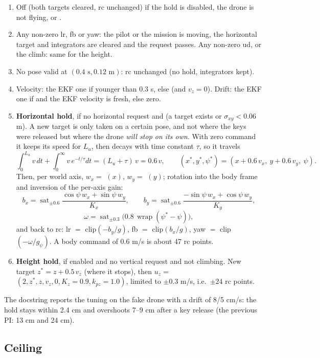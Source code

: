 \begin{enumerate}[itemsep=1pt]
\item Off (both targets cleared, rc unchanged) if the hold is disabled, the drone is not flying, or
.
\item Any non-zero lr, fb or yaw: the pilot or the mission is moving, the horizontal target and integrators are
cleared and the request passes. Any non-zero ud, or the climb: same for the height.
\item No pose valid at $(0.4\text{ s}, 0.12\text{ m})$: rc unchanged (no hold, integrators kept).
\item Velocity: the EKF one if younger than 0.3 s, else  (and $v_z=0$). Drift: the EKF one if
 and the EKF velocity is fresh, else zero.
\item \textbf{Horizontal hold}, if no horizontal request and (a target exists or $\sigma_{xy}<0.06$ m). A new target
is only taken on a certain pose, and not where the keys were released but where the drone \emph{will stop on its
own}. With zero command it keeps its speed for $L_u$, then decays with time constant $\tau$, so it travels
$$
\int_0^{L_u} v\,dt + \int_0^\infty v\,e^{-t/\tau}dt = (L_u+\tau)\,v = 0.6\,v ,
\qquad
(x^\ast,y^\ast,\psi^\ast) = (x+0.6\,v_x,\ y+0.6\,v_y,\ \psi).
$$
Then, per world axis, $w_x=$ $(x)$, $w_y=$ $(y)$; rotation into the body frame and
inversion of the per-axis gain:
$$
b_x = \operatorname{sat}_{\pm0.6}\frac{\cos\psi\,w_x+\sin\psi\,w_y}{K_x},\qquad
b_y = \operatorname{sat}_{\pm0.6}\frac{-\sin\psi\,w_x+\cos\psi\,w_y}{K_y},
$$
$$
\omega =\operatorname{sat}_{\pm0.3}\big(0.8\,\operatorname{wrap}(\psi^\ast-\psi)\big),
$$
and back to rc: lr $=$ clip$(-b_y/g)$, fb $=$ clip$(b_x/g)$, yaw $=$ clip$(-\omega/g_\psi)$. A body command of
0.6 m/s is about 47 rc points.
\item \textbf{Height hold}, if enabled and no vertical request and not climbing. New target
$z^\ast = z + 0.5\,v_z$ (where it stops), then $u_z=$ $(2, z^\ast, z, v_z, 0, K_z{=}0.9, k_{pz}{=}1.0)$,
limited to $\pm0.3$ m/s, i.e.\ $\pm24$ rc points.
\end{enumerate}
The docstring reports the tuning on the fake drone with a drift of 8/5 cm/s: the hold stays within 2.4 cm and
overshoots 7--9 cm after a key release (the previous PI: 13 cm and 24 cm).

\subsection{Ceiling}

